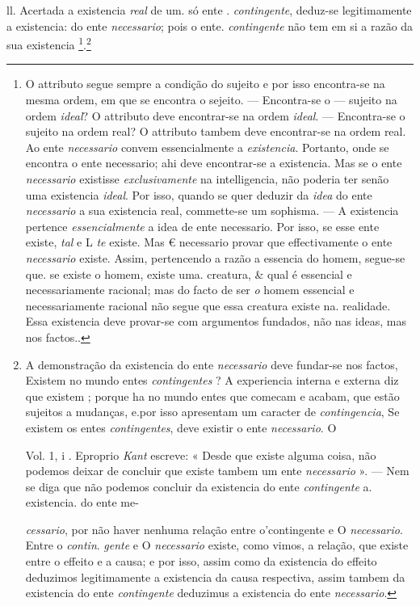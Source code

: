 ll. Acertada a existencia \emph{real} de um. só ente . \emph{contingente}, deduz-se legitimamente a existencia: do ente \emph{necessario}; pois o ente. \emph{contingente} não tem em si a razão da sua existencia \footnote{O attributo segue sempre a condição do sujeito e por isso encontra-se na mesma ordem, em que se encontra o sejeito. --- Encontra-se o --- sujeito na ordem \emph{ideal}? O attributo deve encontrar-se na ordem \emph{ideal}. --- Encontra-se o sujeito na ordem real? O attributo tambem deve encontrar-se na ordem real. Ao ente \emph{necessario} convem essencialmente a \emph{existencia}. Portanto, onde se encontra o ente necessario; ahi deve encontrar-se a existencia. Mas se o ente \emph{necessario} existisse \emph{exclusivamente} na intelligencia, não poderia ter senão uma existencia \emph{ideal}. Por isso, quando se quer deduzir da \emph{idea} do ente \emph{necessario} a sua existencia real, commette-se um sophisma. --- A existencia pertence \emph{essencialmente} a idea de ente necessario. Por isso, se esse ente existe, \emph{tal} e L \emph{te} existe. Mas € necessario provar que effectivamente o ente \emph{necessario} existe. Assim, pertencendo a razão a essencia do homem, segue-se que. se existe o homem, existe uma. creatura, \& qual é essencial e necessariamente racional; mas do facto de ser \emph{o} homem essencial e necessariamente racional não segue que essa creatura existe na. realidade. Essa existencia deve provar-se com argumentos fundados, não nas ideas, mas nos factos..}.\footnote{A demonstração da existencia do ente \emph{necessario} deve fundar-se nos factos, Existem no mundo entes \emph{contingentes} ? A experiencia interna e externa diz que existem ; porque ha no mundo entes que comecam e acabam, que estão sujeitos a mudanças, e.por isso apresentam um caracter de \emph{contingencia}, Se existem os entes \emph{contingentes}, deve existir o ente \emph{necessario}. O\par Vol. 1, i . Eproprio \emph{Kant} escreve: « Desde que existe alguma coisa, não podemos deixar de concluir que existe tambem um ente \emph{necessario} ». --- Nem se diga que não podemos concluir da existencia do ente \emph{contingente} a. existencia. do ente me-\par \emph{cessario}, por não haver nenhuma relação entre o'contingente e O \emph{necessario}. Entre o \emph{contin}. \emph{gente} e O \emph{necessario} existe, como vimos, a relação, que existe entre o effeito e a causa; e por isso, assim como da existencia do effeito deduzimos legitimamente a existencia da causa respectiva, assim tambem da existencia do ente \emph{contingente} deduzimus a existencia do ente \emph{necessario}.}

